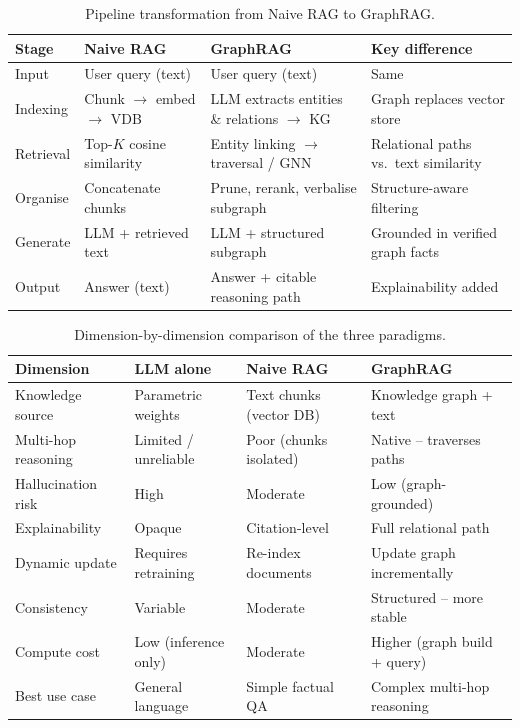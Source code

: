 \documentclass[12pt,a4paper,oneside]{report}
\begin{document}
\begin{table}[htbp]
\centering
\caption{Pipeline transformation from Naive RAG to GraphRAG.}
\label{tab:pipeline_transform}
\small
\begin{tabularx}{\textwidth}{@{}lXXX@{}}
\toprule
\textbf{Stage} & \textbf{Naive RAG} & \textbf{GraphRAG} & \textbf{Key difference} \\
\midrule
Input       & User query (text)            & User query (text)                      & Same \\
Indexing    & Chunk $\to$ embed $\to$ VDB  & LLM extracts entities \& relations $\to$ KG & Graph replaces vector store \\
Retrieval   & Top-$K$ cosine similarity    & Entity linking $\to$ traversal / GNN   & Relational paths vs.\ text similarity \\
Organise    & Concatenate chunks           & Prune, rerank, verbalise subgraph      & Structure-aware filtering \\
Generate    & LLM + retrieved text         & LLM + structured subgraph              & Grounded in verified graph facts \\
Output      & Answer (text)                & Answer + citable reasoning path        & Explainability added \\
\bottomrule
\end{tabularx}
\end{table}

\begin{table}[htbp]
\centering
\caption{Dimension-by-dimension comparison of the three paradigms.}
\label{tab:dimensions}
\small
\begin{tabularx}{\textwidth}{@{}lXXX@{}}
\toprule
\textbf{Dimension} & \textbf{LLM alone} & \textbf{Naive RAG} & \textbf{GraphRAG} \\
\midrule
Knowledge source     & Parametric weights    & Text chunks (vector DB)  & Knowledge graph + text \\
Multi-hop reasoning  & Limited / unreliable  & Poor (chunks isolated)   & Native -- traverses paths \\
Hallucination risk   & High                  & Moderate                 & Low (graph-grounded) \\
Explainability       & Opaque                & Citation-level           & Full relational path \\
Dynamic update       & Requires retraining   & Re-index documents       & Update graph incrementally \\
Consistency          & Variable              & Moderate                 & Structured -- more stable \\
Compute cost         & Low (inference only)  & Moderate                 & Higher (graph build + query) \\
Best use case        & General language      & Simple factual QA        & Complex multi-hop reasoning \\
\bottomrule
\end{tabularx}
\end{table}
\end{document}
